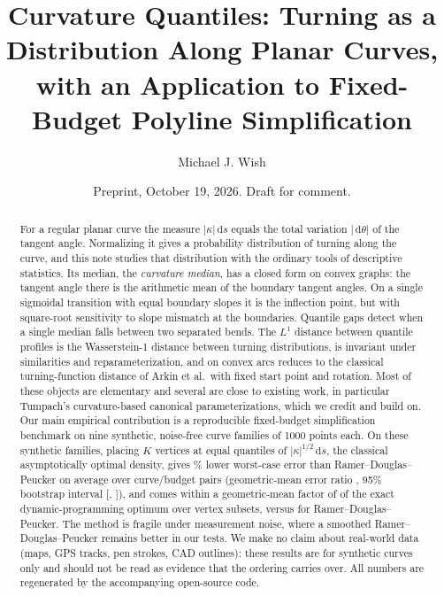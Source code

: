 \documentclass[11pt]{amsart}
\title[Curvature quantiles]{Curvature Quantiles: Turning as a Distribution Along Planar Curves, with an Application to Fixed-Budget Polyline Simplification}
\author{Michael J. Wish}
\date{Preprint, October 19, 2026. Draft for comment.}
\theoremstyle{definition}
\theoremstyle{remark}
\newcommand{\dd}{\,\mathrm{d}}
\begin{document}
\begin{abstract}
For a regular planar curve the measure $|\kappa|\dd s$ equals the total variation $|\dd\theta|$ of the tangent angle. Normalizing it gives a probability distribution of turning along the curve, and this note studies that distribution with the ordinary tools of descriptive statistics. Its median, the \emph{curvature median}, has a closed form on convex graphs: the tangent angle there is the arithmetic mean of the boundary tangent angles. On a single sigmoidal transition with equal boundary slopes it is the inflection point, but with square-root sensitivity to slope mismatch at the boundaries. Quantile gaps detect when a single median falls between two separated bends. The $L^1$ distance between quantile profiles is the Wasserstein-1 distance between turning distributions, is invariant under similarities and reparameterization, and on convex arcs reduces to the classical turning-function distance of Arkin et al.\ with fixed start point and rotation. Most of these objects are elementary and several are close to existing work, in particular Tumpach's curvature-based canonical parameterizations, which we credit and build on. Our main empirical contribution is a reproducible fixed-budget simplification benchmark on nine synthetic, noise-free curve families of 1000 points each. On these synthetic families, placing $K$ vertices at equal quantiles of $|\kappa|^{1/2}\dd s$, the classical asymptotically optimal density, gives \benchGMReduction\% lower worst-case error than Ramer--Douglas--Peucker on average over \benchPairs{} curve/budget pairs (geometric-mean error ratio \benchGM, 95\% bootstrap interval [\benchCILo, \benchCIHi]), and comes within a geometric-mean factor of \optRatioGM{} of the exact dynamic-programming optimum over vertex subsets, versus \rdpOptRatioGM{} for Ramer--Douglas--Peucker. The method is fragile under measurement noise, where a smoothed Ramer--Douglas--Peucker remains better in our tests. We make no claim about real-world data (maps, GPS tracks, pen strokes, CAD outlines): these results are for synthetic curves only and should not be read as evidence that the ordering carries over. All numbers are regenerated by the accompanying open-source code.
\end{abstract}

\maketitle

\end{document}
